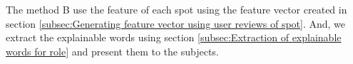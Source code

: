 \documentclass[journal]{IAENGtran}
\begin{document}
The method B use the feature of each spot using the feature vector created in section \ref{subsec:Generating feature vector using user reviews of spot}.
And, we extract the explainable words using section \ref{subsec:Extraction of explainable words for role} and present them to the subjects.

\end{document}
